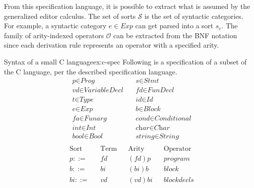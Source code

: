 From this specification language, it is possible to extract what is assumed by the generalized editor calculus\cite{aalborg}. The set of sorts $\mathcal{S}$ is the set of syntactic categories. For example, a syntactic category $e \in Exp$ can get parsed into a sort $s_{e}$.
The family of arity-indexed operators $\mathcal{O}$ can be extracted from the BNF notation since each derivation rule represents an operator with a specified arity.

\begin{example}{Syntax of a small C language}{ex:c-spec}
  Following is a specification of a subset of the C language\cite{c-iso-standard}, per the described specification language.
  \[
    \begin{aligned}
       & \textit{p}         \in \textit{Prog}           \quad & \textit{s}           \in \textit{Stmt}      \\
       & \textit{vd}        \in \textit{VariableDecl}   \quad & \textit{fd}        \in \textit{FunDecl}     \\
       & \textit{t}         \in \textit{Type}           \quad & \textit{id}          \in \textit{Id}        \\
       & \textit{e}         \in \textit{Exp}            \quad & \textit{b}           \in \textit{Block}     \\
       & \textit{fa}        \in \textit{Funarg}         \quad & \textit{cond}      \in \textit{Conditional} \\
       & \textit{int}       \in \textit{Int}            \quad & \textit{char}        \in \textit{Char}      \\
       & \textit{bool}       \in \textit{Bool}          \quad & \textit{string}        \in \textit{String}  \\
    \end{aligned}
  \]
  \[
    \begin{aligned}
       & \text{Sort}     &  & \text{Term}                                            &  & \text{Arity}                  &  & \text{Operator}      \\
       & p ::=           &  & \textit{fd}                                            &  & (fd)p                         &  & program              \\
       & b ::=           &  & \text{$bi$}                                            &  & (bi)b                         &  & block                \\
       & bi ::=          &  & \text{$vd$}                                            &  & (vd)bi                        &  & blockdecls           \\

\end{aligned}\]
\end{example}
